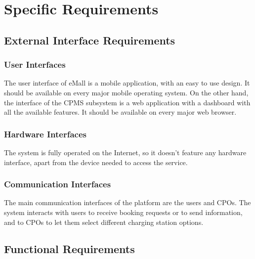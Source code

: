 \section{Specific Requirements}
\subsection{External Interface Requirements}
\subsubsection{User Interfaces}
The user interface of eMall is a mobile application, with an easy to use design.
It should be available on every major mobile operating system.
On the other hand, the interface of the CPMS subsystem is a web application with a dashboard with all the available features.
It should be available on every major web browser.
\subsubsection{Hardware Interfaces}
The system is fully operated on the Internet, so it doesn't feature any hardware interface, apart from the device needed to access the service.
\subsubsection{Communication Interfaces}
The main communication interfaces of the platform are the users and CPOs.
The system interacts with users to receive booking requests or to send information, and to CPOs to let them select different charging station options.
\subsection{Functional Requirements}

